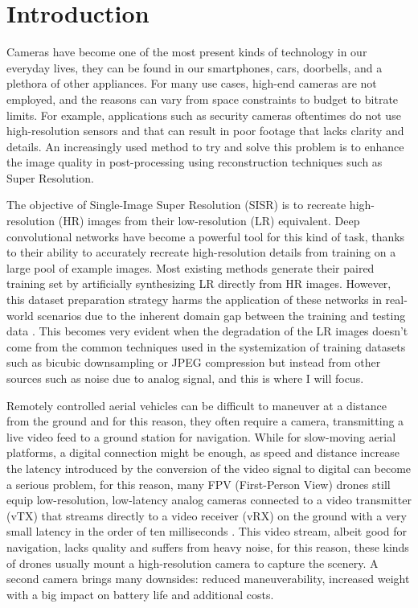 \newpage
\chapter{Introduction}
\label{cha:introduction}

Cameras have become one of the most present kinds of technology in our everyday lives, they can be found in our smartphones, cars, doorbells, and a plethora of other appliances. For many use cases, high-end cameras are not employed, and the reasons can vary from space constraints to budget to bitrate limits. For example, applications such as security cameras oftentimes do not use high-resolution sensors and that can result in poor footage that lacks clarity and details. An increasingly used method to try and solve this problem is to enhance the image quality in post-processing using reconstruction techniques such as Super Resolution.

The objective of Single-Image Super Resolution (SISR) is to recreate high-resolution (HR) images from their low-resolution (LR) equivalent.
Deep convolutional networks have become a powerful tool for this kind of task, thanks to their ability to accurately recreate high-resolution details from training on a large pool of example images.
Most existing methods generate their paired training set by artificially synthesizing LR directly from HR images. However, this dataset preparation strategy harms the application of these networks in real-world scenarios due to the inherent domain gap between the training and testing data \cite{9711325}.
This becomes very evident when the degradation of the LR images doesn't come from the common techniques used in the systemization of training datasets such as bicubic downsampling or JPEG compression but instead from other sources such as noise due to analog signal, and this is where I will focus.

Remotely controlled aerial vehicles can be difficult to maneuver at a distance from the ground and for this reason, they often require a camera, transmitting a live video feed to a ground station for navigation. While for slow-moving aerial platforms, a digital connection might be enough, as speed and distance increase the latency introduced by the conversion of the video signal to digital can become a serious problem, for this reason, many FPV (First-Person View) drones still equip low-resolution, low-latency analog cameras connected to a video transmitter (vTX) that streams directly to a video receiver (vRX) on the ground with a very small latency in the order of ten milliseconds \cite{oscar}. This video stream, albeit good for navigation, lacks quality and suffers from heavy noise, for this reason, these kinds of drones usually mount a high-resolution camera to capture the scenery. A second camera brings many downsides: reduced maneuverability, increased weight with a big impact on battery life and additional costs.

